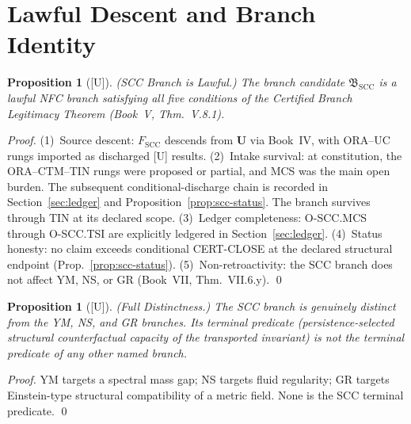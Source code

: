 \documentclass[12pt,oneside]{amsbook}
\theoremstyle{plain}
\newtheorem{proposition}[theorem]{Proposition}
\theoremstyle{definition}
\theoremstyle{remark}
\newcommand{\status}[1]{\textup{[#1]}}
\begin{document}
\section{Lawful Descent and Branch Identity}
\label{sec:descent}

\begin{proposition}[\status{U}]\label{prop:scc-lawful}
\textup{(SCC Branch is Lawful.)} The branch candidate
$\mathfrak{B}_{\mathrm{SCC}}$ is a lawful NFC branch satisfying
all five conditions of the Certified Branch Legitimacy Theorem
(Book~V, Thm.~V.8.1).
\end{proposition}

\begin{proof}
(1)~Source descent: $F_{\mathrm{SCC}}$ descends from $\mathbf{U}$
via Book~IV, with ORA--UC rungs imported as discharged [U] results.
(2)~Intake survival: at constitution, the ORA--CTM--TIN rungs were
proposed or partial, and MCS was the main open burden. The
subsequent conditional-discharge chain is recorded in
Section~\ref{sec:ledger} and Proposition~\ref{prop:scc-status}.
The branch survives through TIN at its declared scope.
(3)~Ledger completeness: O-SCC.MCS through O-SCC.TSI are
explicitly ledgered in Section~\ref{sec:ledger}.
(4)~Status honesty: no claim exceeds conditional CERT-CLOSE at the
declared structural endpoint (Prop.~\ref{prop:scc-status}).
(5)~Non-retroactivity: the SCC branch does not affect YM, NS,
or GR (Book~VII, Thm.~VII.6.y).
\qed
\end{proof}

\begin{proposition}[\status{U}]\label{prop:scc-distinct}
\textup{(Full Distinctness.)} The SCC branch is genuinely
distinct from the YM, NS, and GR branches. Its terminal
predicate (persistence-selected structural counterfactual
capacity of the transported invariant) is not the terminal
predicate of any other named branch.
\end{proposition}

\begin{proof}
YM targets a spectral mass gap; NS targets fluid regularity;
GR targets Einstein-type structural compatibility of a metric
field. None is the SCC terminal predicate.
\qed
\end{proof}
\end{document}
